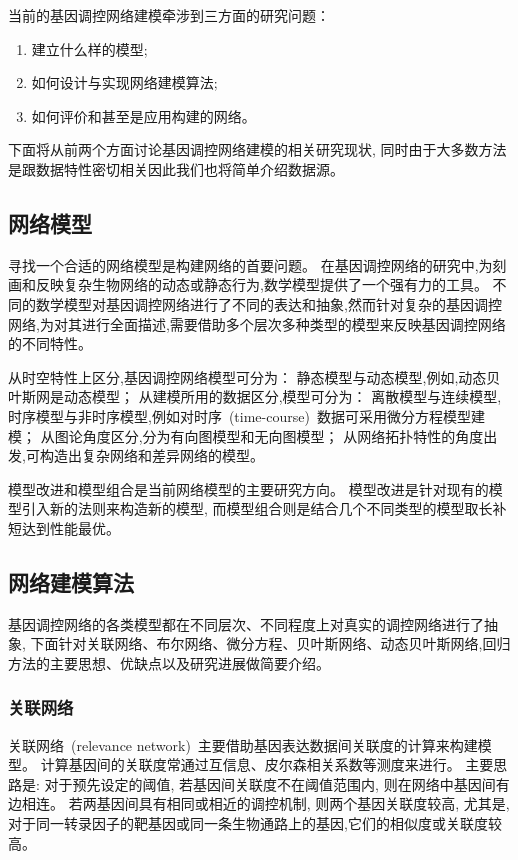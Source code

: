 当前的基因调控网络建模牵涉到三方面的研究问题\cite{schlitt2007current}：
\begin{enumerate}
    \item 建立什么样的模型;
    \item 如何设计与实现网络建模算法;
    \item 如何评价和甚至是应用构建的网络。
\end{enumerate}
下面将从前两个方面讨论基因调控网络建模的相关研究现状,
同时由于大多数方法是跟数据特性密切相关因此我们也将简单介绍数据源。

\subsection{网络模型}
寻找一个合适的网络模型是构建网络的首要问题。
在基因调控网络的研究中,为刻画和反映复杂生物网络的动态或静态行为,数学模型提供了一个强有力的工具。
不同的数学模型对基因调控网络进行了不同的表达和抽象,然而针对复杂的基因调控网络,为对其进行全面描述,需要借助多个层次多种类型的模型来反映基因调控网络的不同特性。

从时空特性上区分,基因调控网络模型可分为：
静态模型与动态模型,例如,动态贝叶斯网是动态模型；
从建模所用的数据区分,模型可分为：
离散模型与连续模型,时序模型与非时序模型,例如对时序~(time-course)~数据可采用微分方程模型建模；
从图论角度区分,分为有向图模型和无向图模型；
从网络拓扑特性的角度出发,可构造出复杂网络和差异网络的模型。

模型改进和模型组合是当前网络模型的主要研究方向。
模型改进是针对现有的模型引入新的法则来构造新的模型,
而模型组合则是结合几个不同类型的模型取长补短达到性能最优。

\subsection{网络建模算法}
基因调控网络的各类模型都在不同层次、不同程度上对真实的调控网络进行了抽象,
下面针对关联网络、布尔网络、微分方程、贝叶斯网络、动态贝叶斯网络,回归方法的主要思想、优缺点以及研究进展做简要介绍。

\subsubsection{关联网络}
关联网络~(relevance network)~主要借助基因表达数据间关联度的计算来构建模型。
计算基因间的关联度常通过互信息、皮尔森相关系数等测度来进行。
主要思路是: 对于预先设定的阈值, 若基因间关联度不在阈值范围内, 则在网络中基因间有边相连。
若两基因间具有相同或相近的调控机制, 则两个基因关联度较高,
尤其是,对于同一转录因子的靶基因或同一条生物通路上的基因,它们的相似度或关联度较高。

